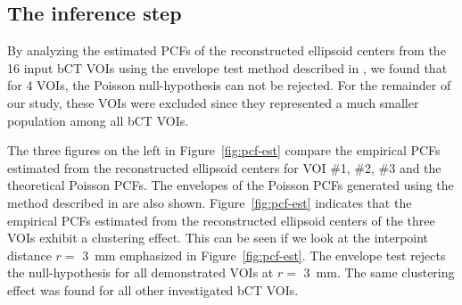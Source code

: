 \documentclass[journal]{IEEEtran}
\begin{document}
\subsection{The inference step}
\label{sec:inference-step}

By analyzing the estimated PCFs of the reconstructed ellipsoid centers
from the 16 input bCT VOIs using the envelope test method described in
\cite{baddeley2014tests}, we found that for 4 VOIs, the Poisson
null-hypothesis can not be rejected. For the remainder of our study,
these VOIs were excluded since they represented a much smaller
population among all bCT VOIs.

The three figures on the left in Figure~\ref{fig:pcf-est} compare the
empirical PCFs estimated from the reconstructed ellipsoid centers for
VOI \#1, \#2, \#3 and the theoretical Poisson PCFs. The envelopes of
the Poisson PCFs generated using the method described in
\cite{baddeley2014tests} are also shown. Figure~\ref{fig:pcf-est}
indicates that the empirical PCFs estimated from the reconstructed
ellipsoid centers of the three VOIs exhibit a clustering effect. This
can be seen if we look at the interpoint distance $r = $ \SI{3}{\mm}
emphasized in Figure~\ref{fig:pcf-est}. The envelope test rejects the
null-hypothesis for all demonstrated VOIs at $r = $ \SI{3}{\mm}. The
same clustering effect was found for all other investigated bCT VOIs.
\end{document}
